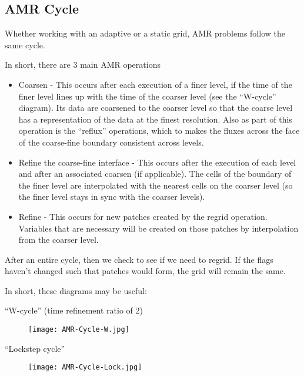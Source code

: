 \subsection{AMR Cycle}

Whether working with an adaptive or a static grid, AMR problems follow
the same cycle. 

In short, there are 3 main AMR operations 
\begin{itemize}

\item Coarsen - This occurs after each execution of a finer level, if
  the time of the finer level lines up with the time of the coarser
  level (see the ``W-cycle'' diagram). Its data are coarsened to the
  coarser level so that the coarse level has a representation of the
  data at the finest resolution. Also as part of this operation is the
  ``reflux'' operations, which to makes the fluxes across the face of
  the coarse-fine boundary consistent across levels.
\item Refine the coarse-fine interface - This occurs after the
  execution of each level and after an associated coarsen (if
  applicable). The cells of the boundary of the finer level are
  interpolated with the nearest cells on the coarser level (so the
  finer level stays in sync with the coarser levels).
\item Refine - This occurs for new patches created by the regrid
  operation. Variables that are necessary will be created on those
  patches by interpolation from the coarser level. 
\end{itemize}

After an entire cycle, then we check to see if we need to regrid. If the flags haven't changed such that patches would form, the grid will remain the same. 

In short, these diagrams may be useful: 

``W-cycle'' (time refinement ratio of 2) 

\begin{figure}[h]
  \centering
  \texttt{[image: AMR-Cycle-W.jpg]}
  \caption{}
  \label{}
\end{figure}

``Lockstep cycle''

\begin{figure}[h]
  \centering
  \texttt{[image: AMR-Cycle-Lock.jpg]}
  \caption{}
  \label{}
\end{figure}
